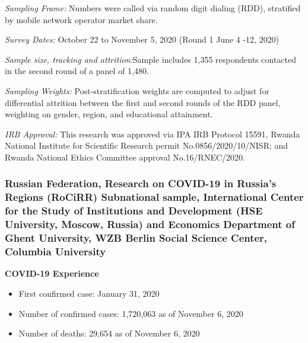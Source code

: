 \documentclass[
  12pt,
]{article}
\begin{document}
\emph{Sampling Frame:} Numbers were called via random digit dialing (RDD), stratified by mobile network operator market share.

\emph{Survey Dates:} October 22 to November 5, 2020 (Round 1 June 4 -12, 2020)

\emph{Sample size, tracking and attrition:}Sample includes 1,355 respondents contacted in the second round of a panel of 1,480.

\emph{Sampling Weights:} Post-stratification weights are computed to adjust for differential attrition between the first and second rounds of the RDD panel, weighting on gender, region, and educational attainment.

\emph{IRB Approval:} This research was approved via IPA IRB Protocol 15591, Rwanda National Institute for Scientific Research permit No.0856/2020/10/NISR; and Rwanda National Ethics Committee approval No.16/RNEC/2020.

\hypertarget{russian-federation-research-on-covid-19-in-russias-regions-rocirr-subnational-sample-international-center-for-the-study-of-institutions-and-development-hse-university-moscow-russia-and-economics-department-of-ghent-university-wzb-berlin-social-science-center-columbia-university}{%
\subsubsection*{Russian Federation, Research on COVID-19 in Russia's Regions (RoCiRR) Subnational sample, International Center for the Study of Institutions and Development (HSE University, Moscow, Russia) and Economics Department of Ghent University, WZB Berlin Social Science Center, Columbia University}\label{russian-federation-research-on-covid-19-in-russias-regions-rocirr-subnational-sample-international-center-for-the-study-of-institutions-and-development-hse-university-moscow-russia-and-economics-department-of-ghent-university-wzb-berlin-social-science-center-columbia-university}}

\textbf{COVID-19 Experience}

\begin{itemize}
\item First confirmed case: January 31, 2020
\item Number of confirmed cases: 1,720,063 as of November 6, 2020 
\item Number of deaths:  29,654 as of November 6, 2020 
\end{itemize}
\end{document}
